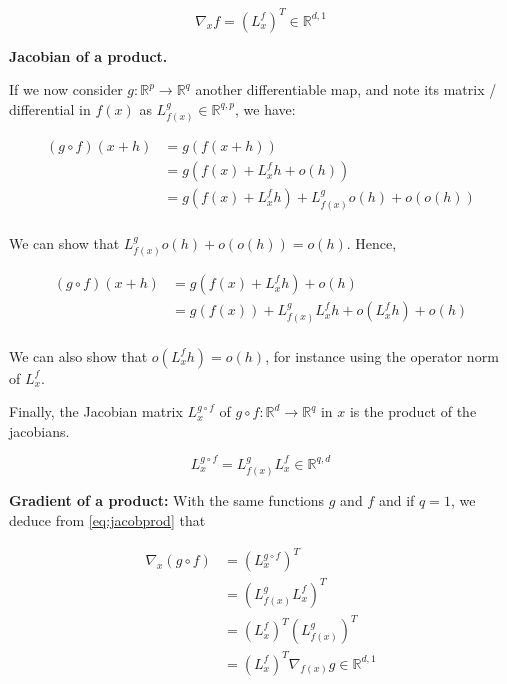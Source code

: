\documentclass[
10pt, %
a4paper, %
oneside, %
headinclude,footinclude, %
BCOR5mm, %
]{scrartcl}
\begin{document}
\begin{equation*}
    \nabla_xf=(L^f_x)^T\in \mathbb{R}^{d, 1}
\end{equation*}

\textbf{{Jacobian of a product.}} 

If we now consider $g: \mathbb{R}^p\rightarrow \mathbb{R}^q$ another differentiable map, and note its matrix / differential in $f(x)$ as $L^g_{f(x)}\in \mathbb{R}^{q, p}$, we have:

\begin{equation*}
    \begin{aligned}
	(g\circ f)(x+h)&=g(f(x+h))\\
	&=g(f(x)+L^f_xh+o(h))\\
	&=g(f(x)+L^f_xh)+L^g_{f(x)}o(h)+o(o(h))\\
    \end{aligned}
\end{equation*}

We can show that $L^g_{f(x)}o(h)+o(o(h))=o(h)$. Hence, 

\begin{equation*}
    \begin{aligned}
	(g\circ f)(x+h)&=g(f(x)+L^f_xh)+o(h)\\
	&=g(f(x))+L^g_{f(x)}L^f_xh+o(L^f_xh)+o(h)\\
    \end{aligned}
\end{equation*}

We can also show that $o(L^f_xh)=o(h)$, for instance using the operator norm of $L^f_x$.

Finally, the Jacobian matrix $L^{g\circ f}_x$ of $g\circ f: \mathbb{R}^d\rightarrow \mathbb{R}^q$ in $x$ is the product of the jacobians.

\begin{equation}
    \label{eq:jacobprod}
    L^{g\circ f}_x=L^{g}_{f(x)}L^f_x\in \mathbb{R}^{q, d}
\end{equation}


\textbf{{Gradient of a product:}} 
With the same functions $g$ and $f$ and if $q=1$, we deduce from \ref{eq:jacobprod} that 

\begin{equation*}
    \begin{aligned}
	\nabla_x(g\circ f)&= (L^{g\circ f}_x)^T\\
	&=(L^{g}_{f(x)}L^f_x)^T\\
	&=(L^f_x)^T(L^{g}_{f(x)})^T\\
	&= (L^f_x)^T\nabla_{f(x)}g\in \mathbb{R}^{d, 1}
    \end{aligned}
\end{equation*}
\end{document}
